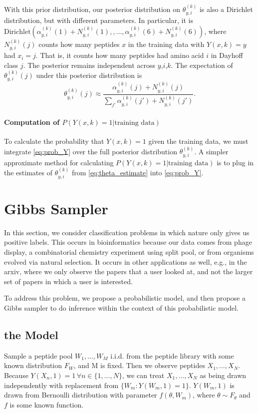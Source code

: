 \documentclass[12pt]{article}
\newcommand{\data}{\text{training data}}
\begin{document}
With this prior distribution, our posterior distribution on $\theta^{(k)}_{y,i}$ is also a Dirichlet distribution, but with different parameters.
In particular, it is 
$\mathrm{Dirichlet}(
\alpha^{(k)}_{y,i}(1) + N^{(k)}_{y,i}(1), 
,\ldots,
\alpha^{(k)}_{y,i}(6) + N^{(k)}_{y,i}(6))$,
where $N^{(k)}_{y,i}(j)$ counts how many peptides $x$ in the training data with $Y(x,k)=y$ had $x_i=j$.  That is, it counts how many peptides had amino acid $i$ in Dayhoff class $j$.
The posterior remains independent across $y$,$i$,$k$.
The expectation of $\theta^{(k)}_{y,i}(j)$ under this posterior distribution is 
\begin{equation}
  \label{eq:theta_estimate}
  \theta^{(k)}_{y,i}(j) \approx
  \frac{\alpha^{(k)}_{y,i}(j) + N^{(k)}_{y,i}(j)}{\sum_{j'} \alpha^{(k)}_{y,i}(j') + N^{(k)}_{y,i}(j')}.
\end{equation}

\paragraph{Computation of $P(Y(x,k)=1 | \data)$}
To calculate the probability that $Y(x,k)=1$ given the training data, we must integrate \eqref{eq:prob_Y} over the full posterior distribution $\theta^{(k)}_{y,i}$.
A simpler approximate method for calculating $P(Y(x,k)=1 | \data)$ is to plug in the estimates of $\theta^{(k)}_{y,i}$ from \eqref{eq:theta_estimate} into \eqref{eq:prob_Y}.

\section{Gibbs Sampler}
In this section, we consider classification problems in which nature only gives us positive labels.  This occurs in bioinformatics because our data comes from phage display, a combinatorial chemistry experiment using split pool, or from organisms evolved via natural selection.  It occurs in other applications as well, e.g., in the arxiv, where we only observe the papers that a user looked at, and not the larger set of papers in which a user is interested.

To address this problem, we propose a probabilistic model, and then propose a Gibbs sampler to do inference within the context of this probabilistic model.
\subsection{the Model}
Sample a peptide pool $W_1, \ldots, W_M$ i.i.d. from the peptide library with some known distribution $F_W$, and M is fixed. Then we observe peptides $X_1, \ldots, X_N$. Because $Y(X_n,1)=1 \, \forall n \in \{1,\ldots,N\}$, we can treat $X_1,\ldots,X_N$ as being drawn independently with replacement from $\{W_m: Y(W_m,1)=1\}$. $Y(W_m,1)$ is drawn from Bernoulli distribution with parameter $f(\theta,W_m)$, where $\theta \sim F_{\theta}$ and $f$ is some known function.
\end{document}
